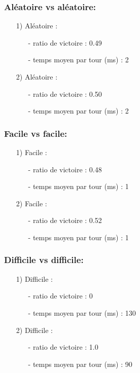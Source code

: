 \documentclass[a4paper, 12pt]{article}
\begin{document}
\subsubsection{Aléatoire vs aléatoire:}
\begin{itemize}
\item[1)] Aléatoire : 
\begin{itemize}
\item[-] ratio de victoire : 0.49
\item[-] temps moyen par tour (ms) : 2
\end{itemize}
\item[2)] Aléatoire : 
\begin{itemize}
\item[-] ratio de victoire : 0.50
\item[-] temps moyen par tour (ms) : 2
\end{itemize}
\end{itemize}

\subsubsection{Facile vs facile:}
\begin{itemize}
\item[1)] Facile : 
\begin{itemize}
\item[-] ratio de victoire : 0.48
\item[-] temps moyen par tour (ms) : 1
\end{itemize}
\item[2)] Facile : 
\begin{itemize}
\item[-] ratio de victoire : 0.52
\item[-] temps moyen par tour (ms) : 1
\end{itemize}
\end{itemize}

\subsubsection{Difficile vs difficile:}
\begin{itemize}
\item[1)] Difficile : 
\begin{itemize}
\item[-] ratio de victoire : 0
\item[-] temps moyen par tour (ms) : 130
\end{itemize}
\item[2)] Difficile : 
\begin{itemize}
\item[-] ratio de victoire : 1.0
\item[-] temps moyen par tour (ms) : 90
\end{itemize}
\end{itemize}
\end{document}
